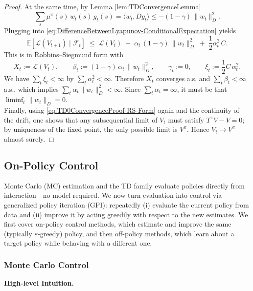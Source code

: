 \documentclass[
]{book}
\theoremstyle{definition}
\theoremstyle{definition}
\theoremstyle{definition}
\theoremstyle{definition}
\theoremstyle{remark}
\begin{document}
\begin{proof}
At the same time, by Lemma \ref{lem:TDConvergenceLemma}
\[
\sum_s \mu^\pi(s)\,w_t(s)\,g_t(s)
=\langle w_t, D g_t\rangle
\le -(1-\gamma)\,\|w_t\|_D^2.
\]
Plugging into \eqref{eq:DifferenceBetweenLyapunov-ConditionalExpectation} yields
\begin{equation}
\mathbb E\!\left[\mathcal L(V_{t+1})\mid \mathcal F_t\right]
\;\le\;
\mathcal L(V_t)\;-\;\alpha_t\,(1-\gamma)\,\|w_t\|_D^2\;+\;\frac{1}{2} \alpha_t^2\,C.
\label{eq:TD0ConvergenceProof-RS-Form}
\end{equation}
This is in Robbins--Siegmund form with
\[
X_t:=\mathcal L(V_t),\qquad
\beta_t:=(1-\gamma)\,\alpha_t\,\|w_t\|_D^2,\qquad
\gamma_t:=0,\qquad
\xi_t:=\frac{1}{2} C\,\alpha_t^2.
\]
We have \(\sum_t \xi_t<\infty\) by \(\sum_t \alpha_t^2<\infty\). Therefore \(X_t\) converges a.s. and \(\sum_t \beta_t<\infty\) a.s., which implies \(\sum_t \alpha_t \|w_t\|_D^2<\infty\). Since \(\sum_t \alpha_t=\infty\), it must be that \(\liminf_t \|w_t\|_D=0\).\\
Finally, using \eqref{eq:TD0ConvergenceProof-RS-Form} again and the continuity of the drift, one shows that any subsequential limit of \(V_t\) must satisfy \(T^\pi V - V=0\); by uniqueness of the fixed point, the only possible limit is \(V^\pi\). Hence \(V_t\to V^\pi\) almost surely.
\end{proof}

\subsection{On-Policy Control}\label{on-policy-control}

Monte Carlo (MC) estimation and the TD family evaluate policies directly from interaction---no model required. We now turn evaluation into control via generalized policy iteration (GPI): repeatedly (i) evaluate the current policy from data and (ii) improve it by acting greedily with respect to the new estimates. We first cover on-policy control methods, which estimate and improve the same (typically \(\varepsilon\)-greedy) policy, and then off-policy methods, which learn about a target policy while behaving with a different one.

\subsubsection{Monte Carlo Control}\label{monte-carlo-control}

\textbf{High-level Intuition.}
\end{document}
